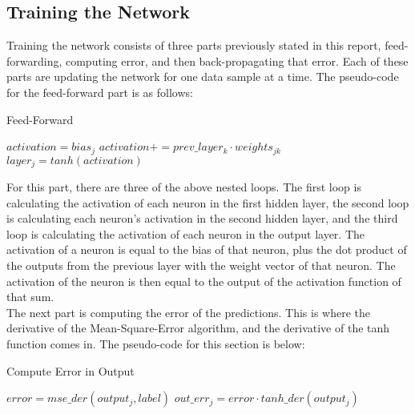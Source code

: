\documentclass[twoside,twocolumn]{article}
\begin{document}
\subsection{Training the Network}
Training the network consists of three parts previously stated in this report, feed-forwarding, computing error, and then back-propagating that error. Each of these parts are updating the network for one data sample at a time. The pseudo-code for the feed-forward part is as follows:\\
\begin{algorithm}[h]
\caption{Feed-Forward}
\begin{algorithmic}
\State $activation=bias_j$
\State $activation+=prev\_layer_{k}\cdot weights_{jk}$
\EndFor
\State $layer_j = tanh(activation)$
\EndFor
\end{algorithmic}
\end{algorithm}
For this part, there are three of the above nested loops. The first loop is calculating the activation of each neuron in the first hidden layer, the second loop is calculating each neuron's activation in the second hidden layer, and the third loop is calculating the activation of each neuron in the output layer. The activation of a neuron is equal to the bias of that neuron, plus the dot product of the outputs from the previous layer with the weight vector of that neuron. The activation of the neuron is then equal to the output of the activation function of that sum.\\

The next part is computing the error of the predictions. This is where the derivative of the Mean-Square-Error algorithm, and the derivative of the tanh function comes in. The pseudo-code for this section is below:\\
\begin{algorithm}[h]
\caption{Compute Error in Output}
\begin{algorithmic}
\State $error=mse\_der(output_j, label)$
\State $out\_err_j = error\cdot tanh\_der(output_j)$
\EndFor
\end{algorithmic}
\end{algorithm}
\end{document}
